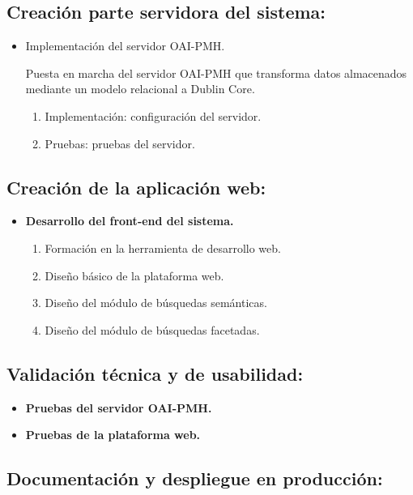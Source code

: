 \subsection{Creación parte servidora del sistema:}

\begin{itemize}
	\item Implementación del servidor OAI-PMH.

	Puesta en marcha del servidor OAI-PMH que transforma datos almacenados mediante un modelo relacional a Dublin Core.

	\begin{enumerate}
		\item Implementación: configuración del servidor.
		\item Pruebas: pruebas del servidor.
	\end{enumerate}
\end{itemize}

\subsection{Creación de la aplicación web:}

\begin{itemize}
	\item \textbf{Desarrollo del front-end del sistema.}
	\begin{enumerate}
		\item Formación en la herramienta de desarrollo web.
		\item Diseño básico de la plataforma web.
		\item Diseño del módulo de búsquedas semánticas.
		\item Diseño del módulo de búsquedas facetadas.
	\end{enumerate}	
\end{itemize}

\subsection{Validación técnica y de usabilidad:}

\begin{itemize}
	\item \textbf{Pruebas del servidor OAI-PMH.}
	\item \textbf{Pruebas de la plataforma web.}
\end{itemize}

\subsection{Documentación y despliegue en producción:}

